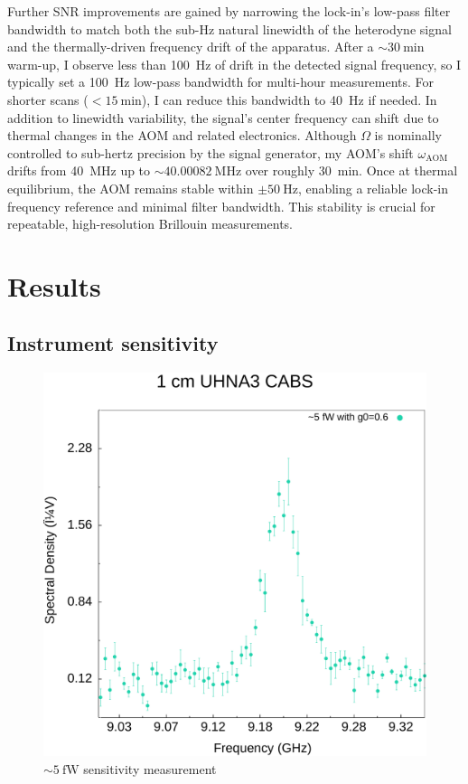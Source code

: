 Further \ac{SNR} improvements are gained by narrowing the lock-in’s low-pass filter bandwidth to match both the sub-\si{\hertz} natural linewidth of the heterodyne signal and the thermally-driven frequency drift of the apparatus. After a \(\sim\!\SI{30}{\minute}\) warm-up, I observe less than \SI{100}{\hertz} of drift in the detected signal frequency, so I typically set a \SI{100}{\hertz} low-pass bandwidth for multi-hour measurements. For shorter scans (\(< \SI{15}{\minute}\)), I can reduce this bandwidth to \SI{40}{\hertz} if needed. In addition to linewidth variability, the signal’s center frequency can shift due to thermal changes in the \ac{AOM} and related electronics. Although \(\Omega\) is nominally controlled to sub-hertz precision by the signal generator, my \ac{AOM}’s shift \(\omega_{\mathrm{AOM}}\) drifts from \SI{40}{\mega\hertz} up to \(\sim\!\SI{40.00082}{\mega\hertz}\) over roughly \SI{30}{\minute}. Once at thermal equilibrium, the \ac{AOM} remains stable within \(\pm\SI{50}{\hertz}\), enabling a reliable lock-in frequency reference and minimal filter bandwidth. This stability is crucial for repeatable, high-resolution Brillouin measurements.

\section{Results}\label{Results}
\subsection{Instrument sensitivity}
\label{Results:Instrument sensitivity and SBS comparison}

\begin{figure}[t]
  \centering
  \includegraphics[width=\textwidth]{figs/4-CABS/5fWSensitivity.pdf}
  \caption{\(\sim\SI{5}{\femto\watt}\) sensitivity measurement}
  \label{fig:5fWSensitivity}
\end{figure}


